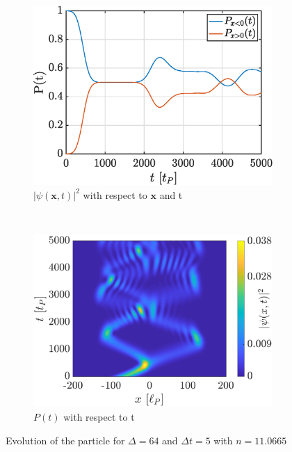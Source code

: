 \documentclass[a4paper,12pt,twoside]{article}
\newcommand{\mbf}[1]{\mathbf{#1}} %
\begin{document}
\begin{figure}[h]
  \centering
  \begin{subfigure}[t]{0.45\textwidth}
    \includegraphics[width=\textwidth]{graphs/iii_findn_cont_prob.eps}
    \caption{$|\psi(\mbf{x}, t)|^2$ with respect to $\mbf{x}$ and t}
    \label{fig:iii_findn_prob}
  \end{subfigure}
  ~
  \begin{subfigure}[t]{0.45\textwidth}
    \includegraphics[width=\textwidth]{graphs/iii_findn_cont_evo.eps}
    \caption{$P(t)$ with respect to t}
    \label{fig:iii_findn_psi}
  \end{subfigure}
  \caption{Evolution of the particle for $\Delta = 64$ and $\Delta t = 5$ with $n=\num{11.0665}$}
  \label{fig:iii_findn}
\end{figure}
\end{document}
